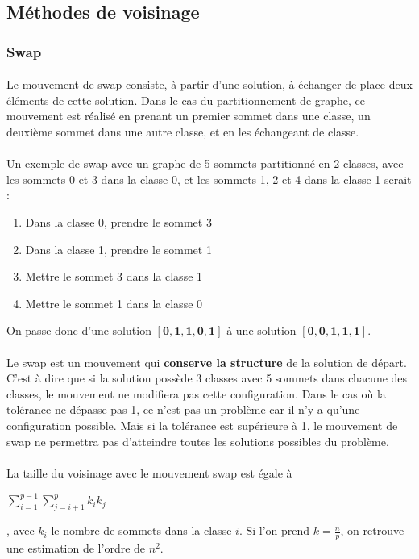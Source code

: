 \documentclass[12pt]{article}
\begin{document}
\subsection{Méthodes de voisinage}

\subsubsection{Swap}

\paragraph{}Le mouvement de swap consiste, à partir d'une solution, à échanger de place deux éléments de cette solution. Dans le cas du partitionnement de graphe, ce mouvement est réalisé en prenant un premier sommet dans une classe, un deuxième sommet dans une autre classe, et en les échangeant de classe.

\paragraph{}Un exemple de swap avec un graphe de 5 sommets partitionné en 2 classes, avec les sommets 0 et 3 dans la classe 0, et les sommets 1, 2 et 4 dans la classe 1 serait :
\begin{enumerate}
	\item Dans la classe 0, prendre le sommet 3
	\item Dans la classe 1, prendre le sommet 1
	\item Mettre le sommet 3 dans la classe 1
	\item Mettre le sommet 1 dans la classe 0
\end{enumerate}
On passe donc d'une solution $\mathbf{[0,1,1,0,1]}$ à une solution $\mathbf{[0,0,1,1,1]}$.

\paragraph{}Le swap est un mouvement qui \textbf{conserve la structure} de la solution de départ. C'est à dire que si la solution possède 3 classes avec 5 sommets dans chacune des classes, le mouvement ne modifiera pas cette configuration. Dans le cas où la tolérance ne dépasse pas 1, ce n'est pas un problème car il n'y a qu'une configuration possible. Mais si la tolérance est supérieure à 1, le mouvement de swap ne permettra pas d'atteindre toutes les solutions possibles du problème.

\paragraph{}La taille du voisinage avec le mouvement swap est égale à
\begin{large}$\sum\limits_{i=1}^{p-1} \sum\limits_{j=i+1}^p k_i k_j$\end{large}, avec $k_i$ le nombre de sommets dans la classe $i$. Si l'on prend $k=\frac{n}{p}$, on retrouve une estimation de l'ordre de $n^2$.
\end{document}
